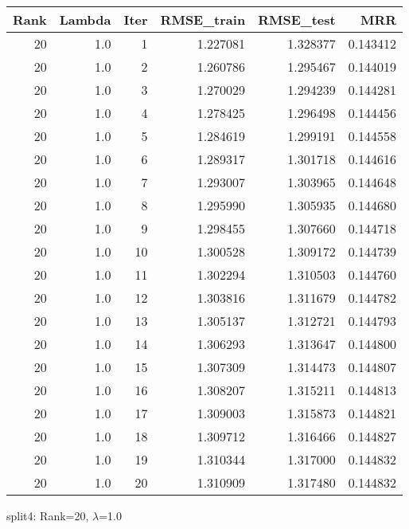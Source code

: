 \begin{tabular}{rrrrrr}
\toprule
 Rank &  Lambda &  Iter &  RMSE\_train &  RMSE\_test &       MRR \\
\midrule
   20 &     1.0 &     1 &    1.227081 &   1.328377 &  0.143412 \\
   20 &     1.0 &     2 &    1.260786 &   1.295467 &  0.144019 \\
   20 &     1.0 &     3 &    1.270029 &   1.294239 &  0.144281 \\
   20 &     1.0 &     4 &    1.278425 &   1.296498 &  0.144456 \\
   20 &     1.0 &     5 &    1.284619 &   1.299191 &  0.144558 \\
   20 &     1.0 &     6 &    1.289317 &   1.301718 &  0.144616 \\
   20 &     1.0 &     7 &    1.293007 &   1.303965 &  0.144648 \\
   20 &     1.0 &     8 &    1.295990 &   1.305935 &  0.144680 \\
   20 &     1.0 &     9 &    1.298455 &   1.307660 &  0.144718 \\
   20 &     1.0 &    10 &    1.300528 &   1.309172 &  0.144739 \\
   20 &     1.0 &    11 &    1.302294 &   1.310503 &  0.144760 \\
   20 &     1.0 &    12 &    1.303816 &   1.311679 &  0.144782 \\
   20 &     1.0 &    13 &    1.305137 &   1.312721 &  0.144793 \\
   20 &     1.0 &    14 &    1.306293 &   1.313647 &  0.144800 \\
   20 &     1.0 &    15 &    1.307309 &   1.314473 &  0.144807 \\
   20 &     1.0 &    16 &    1.308207 &   1.315211 &  0.144813 \\
   20 &     1.0 &    17 &    1.309003 &   1.315873 &  0.144821 \\
   20 &     1.0 &    18 &    1.309712 &   1.316466 &  0.144827 \\
   20 &     1.0 &    19 &    1.310344 &   1.317000 &  0.144832 \\
   20 &     1.0 &    20 &    1.310909 &   1.317480 &  0.144832 \\
\bottomrule
\end{tabular}

\caption{split4: Rank=20, $\lambda$=1.0}

